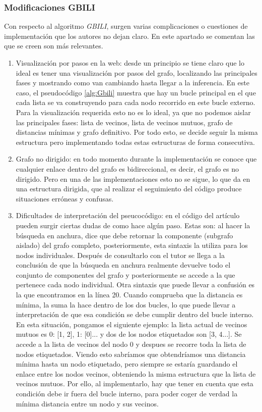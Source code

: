 \subsubsection{Modificaciones GBILI}\label{sec5:gbili}
Con respecto al algoritmo \textit{GBILI}, surgen varias complicaciones o cuestiones de implementación que los autores no dejan claro. En este apartado se comentan las que se creen son más relevantes.
\begin{enumerate}
	\item Visualización por pasos en la web: desde un principio se tiene claro que lo ideal es tener una visualización por pasos del grafo, localizando las principales fases y mostrando como van cambiando hasta llegar a la inferencia. En este caso, el pseudocódigo \ref{alg:Gbili} muestra que hay un bucle principal en el que cada lista se va construyendo para cada nodo recorrido en este bucle externo. Para la visualización requerida esto no es lo ideal, ya que no podemos aislar las principales fases: lista de vecinos, lista de vecinos mutuos, grafo de distancias mínimas y grafo definitivo. Por todo esto, se decide seguir la misma estructura pero implementando todas estas estructuras de forma consecutiva.
	\item Grafo no dirigido: en todo momento durante la implementación se conoce que cualquier enlace dentro del grafo es bidireccional, es decir, el grafo es no dirigido. Pero en una de las implementaciones esto no se sigue, lo que da en una estructura dirigida, que al realizar el seguimiento del código produce situaciones erróneas y confusas.
	\item Dificultades de interpretación del pseucocódigo: en el código del artículo pueden surgir ciertas dudas de como hace algún paso. Estas son: al hacer la búsqueda en anchura, dice que debe retornar la componente (subgrafo aislado) del grafo completo, posteriormente, esta sintaxis la utiliza para los nodos individuales. Después de consultarlo con el tutor se llega a la conclusión de que la búsqueda en anchura realmente devuelve todo el conjunto de componentes del grafo y posteriormente se accede a la que pertenece cada nodo individual. Otra sintaxis que puede llevar a confusión es la que encontramos en la línea 20. Cuando comprueba que la distancia es mínima, la suma la hace dentro de los dos bucles, lo que puede llevar a interpretación de que esa condición se debe cumplir dentro del bucle interno. En esta situación, pongamos el siguiente ejemplo: la lista actual de vecinos mutuos es {0: [1, 2], 1: [0]...} y dos de los nodos etiquetados son [3, 4...]. Se accede a la lista de vecinos del nodo 0 y despues se recorre toda la lista de nodos etiquetados. Viendo esto sabríamos que obtendríamos una distancia mínima hasta un nodo etiquetado, pero siempre se estaría guardando el enlace entre los nodos vecinos, obteniendo la misma estructura que la lista de vecinos mutuos. Por ello, al implementarlo, hay que tener en cuenta que esta condición debe ir fuera del bucle interno, para poder coger de verdad la mínima distancia entre un nodo y sus vecinos.

\end{enumerate}
